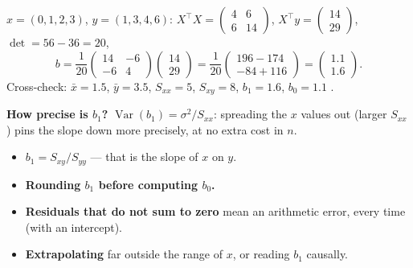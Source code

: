 \documentclass[11pt]{article}
\begin{document}
\begin{worked}
$x = (0, 1, 2, 3)$, $y = (1, 3, 4, 6)$:
$X^\top X = \begin{pmatrix}4 & 6\\ 6 & 14\end{pmatrix}$,
$X^\top y = \begin{pmatrix}14\\ 29\end{pmatrix}$, $\det = 56 - 36 = 20$,
\[
  b = \frac1{20}\begin{pmatrix}14 & -6\\ -6 & 4\end{pmatrix}
      \begin{pmatrix}14\\29\end{pmatrix}
    = \frac1{20}\begin{pmatrix}196 - 174\\ -84 + 116\end{pmatrix}
    = \begin{pmatrix}1.1\\ 1.6\end{pmatrix}.
\]
Cross-check: $\bar x = 1.5$, $\bar y = 3.5$, $S_{xx} = 5$, $S_{xy} = 8$,
$b_1 = 1.6$, $b_0 = 1.1$ \checkmark.

\textbf{How precise is $b_1$?} $\operatorname{Var}(b_1) = \sigma^2/S_{xx}$:
spreading the $x$ values out (larger $S_{xx}$) pins the slope down more
precisely, at no extra cost in $n$.
\end{worked}

\begin{caution}
\begin{itemize}
  \item \textbf{$b_1 = S_{xy}/S_{yy}$} --- that is the slope of $x$ on $y$.
  \item \textbf{Rounding $b_1$ before computing $b_0$.}
  \item \textbf{Residuals that do not sum to zero} mean an arithmetic error,
    every time (with an intercept).
  \item \textbf{Extrapolating} far outside the range of $x$, or reading $b_1$
    causally.
\end{itemize}
\end{caution}
\end{document}
